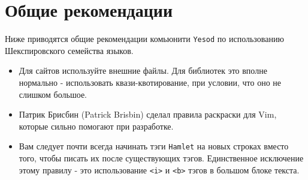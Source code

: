 \section{Общие рекомендации}

Ниже приводятся общие рекомендации комьюнити \texttt{Yesod} по использованию
Шекспировского семейства языков.

\begin{itemize}
    \item Для сайтов используйте внешние файлы. Для библиотек это вполне
        нормально - использовать квази-квотирование, при условии, что оно не
        слишком большое.
    \item Патрик Брисбин (Patrick Brisbin) сделал правила раскраски для Vim,
        которые сильно помогают при разработке.
    \item Вам следует почти всегда начинать тэги \texttt{Hamlet} на новых
        строках вместо того, чтобы писать их после существующих тэгов.
        Единственное исключение этому правилу - это использование
        \lstinline!<i>! и \lstinline!<b>! тэгов в большом блоке текста.
\end{itemize}
